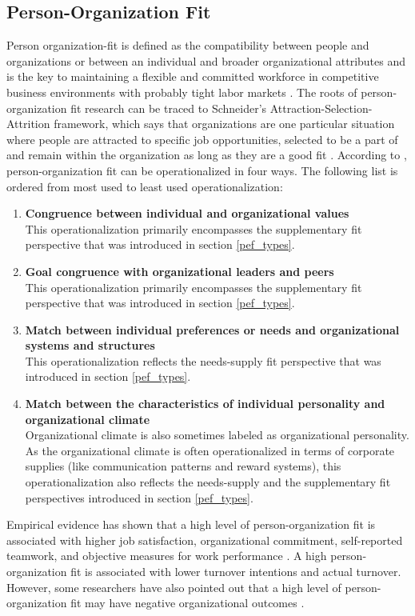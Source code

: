 \documentclass[draft,final]{thesisclass} %
\begin{document}
\subsection{Person-Organization Fit}
Person organization-fit is defined as the compatibility between people and organizations or between an individual and broader organizational attributes and is the key to maintaining a flexible and committed workforce in competitive business environments with probably tight labor markets \parencite[182]{po_and_pj_fit_literature_review}.
The roots of person-organization fit research can be traced to Schneider's Attraction-Selection-Attrition framework, which says that organizations are one particular situation where people are attracted to specific job opportunities, selected to be a part of and remain within the organization as long as they are a good fit \parencite[182]{po_and_pj_fit_literature_review}.
According to \textcite[182]{po_and_pj_fit_literature_review}, person-organization fit can be operationalized in four ways. The following list is ordered from most used to least used operationalization:
\begin{enumerate}
    \item \textbf{Congruence between individual and organizational values}\\
    This operationalization primarily encompasses the supplementary fit perspective that was introduced in section \ref{pef_types}.
    \item \textbf{Goal congruence with organizational leaders and peers}\\
    This operationalization primarily encompasses the supplementary fit perspective that was introduced in section \ref{pef_types}.
    \item \textbf{Match between individual preferences or needs and organizational systems and structures}\\
    This operationalization reflects the needs-supply fit perspective that was introduced in section \ref{pef_types}.
    \item \textbf{Match between the characteristics of individual personality and organizational climate}\\
    Organizational climate is also sometimes labeled as organizational personality.
    As the organizational climate is often operationalized in terms of corporate supplies (like communication patterns and reward systems), this operationalization also reflects the needs-supply and the supplementary fit perspectives introduced in section \ref{pef_types}.
\end{enumerate}
Empirical evidence has shown that a high level of person-organization fit is associated with higher job satisfaction, organizational commitment, self-reported teamwork, and objective measures for work performance \parencite[183]{po_and_pj_fit_literature_review}.
A high person-organization fit is associated with lower turnover intentions and actual turnover. However, some researchers have also pointed out that a high level of person-organization fit may have negative organizational outcomes \parencite[183]{po_and_pj_fit_literature_review}.
\end{document}
